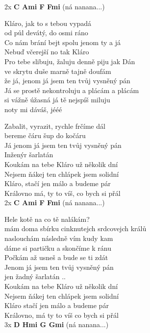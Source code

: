 
2x \textbf{C Ami F Fmi} (ná nanana...)

Kláro, jak to s tebou vypadá\\
od půl devátý, do osmi ráno\\
Co nám brání bejt spolu jenom ty a já\\
Nebuď včerejší no tak Kláro\\

Pro tebe slibuju, žaluju denně piju jak Dán\\
ve skrytu duše marně tajně doufám\\
že já, jenom já jsem ten tvůj vysněný pán \\

Já se prostě nekontroluju a plácám a plácám\\
si vážně úžasná já tě nejspíš miluju\\
noty mi dáváš, jééé 

Zabalit, vyrazit, rychle frčíme dál\\
bereme čáru šup do kočáru\\
Já jenom já jsem ten tvůj vysněný pán\\
Inženýr šarlatán\\

Koukám na tebe Kláro už několik dní\\
Nejsem ňákej ten chlápek jsem solidní\\
Kláro, stačí jen málo a budeme pár\\
Královno má, ty to víš, co bych si přál\\

2x \textbf{C Ami F Fmi} (ná nanana...)

Hele kotě na co tě nalákám?\\
mám doma sbírku cinknutejch srdcovejch králů\\
naslouchám následně vím kudy kam\\
dáme si partičku a skončíme k ránu\\
Počkám až usneš a bude se ti zdát\\ 
Jenom já jsem ten tvůj vysněný pán\\
jen žadný šarlatán ..\\

Koukám na tebe Kláro už několik dní\\
Nejsem ňákej ten chlápek jsem solidní\\
Kláro stačí jen málo a budeme pár\\
Královno, má ty to víš co bych si přál\\

3x \textbf{D Hmi G Gmi} (ná nanana...)

\newpage
